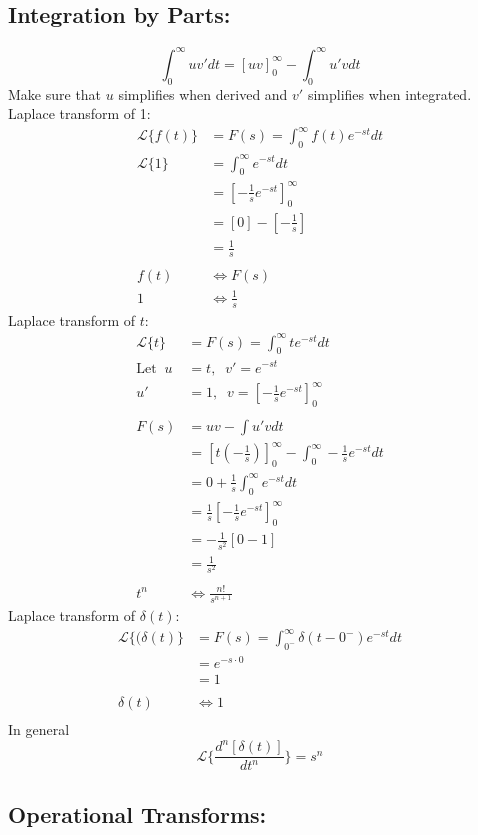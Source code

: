\documentclass[a5paper]{article}
\newcommand{\Lap}{\mathcal{L}}
\begin{document}
	\subsection{Integration by Parts:}
	$$\int^{\infty}_{0}uv'dt=[uv]^{\infty}_{0}-\int^{\infty}_{0}u'vdt$$
	Make sure that $u$ simplifies when derived and $v'$ simplifies when integrated. Laplace transform of 1:
	\begin{align*}
		\Lap\{f(t)\}&=F(s)=\int^{\infty}_{0}f(t)e^{-st}dt\\
		\Lap\{1\}&=\int^{\infty}_{0}e^{-st}dt\\
		&=[-\frac{1}{s}e^{-st}]^{\infty}_{0}\\
		&=[0]-[-\frac{1}{s}]\\
		&=\frac{1}{s}\\\\
		f(t)&\Leftrightarrow F(s)\\
		1&\Leftrightarrow \frac{1}{s}
	\end{align*}
	Laplace transform of $t$:
	\begin{align*}
		\Lap\{t\}&=F(s)=\int^{\infty}_{0}te^{-st}dt\\
		\text{Let}\;\;u&=t,\;\;v'=e^{-st}\\
		u'&=1,\;\;v=[-\frac{1}{s}e^{-st}]^{\infty}_{0}\\\\
		F(s)&=uv-\int u'vdt\\
		&=[t(-\frac{1}{s})]^{\infty}_{0}-\int^{\infty}_{0}-\frac{1}{s}e^{-st}dt\\
		&=0+\frac{1}{s}\int^{\infty}_{0}e^{-st}dt\\
		&=\frac{1}{s}[-\frac{1}{s}e^{-st}]^{\infty}_{0}\\
		&=-\frac{1}{s^{2}}[0-1]\\
		&=\frac{1}{s^{2}}\\\\
		t^{n}&\Leftrightarrow \frac{n!}{s^{n+1}}
	\end{align*}
	Laplace transform of $\delta(t)$:
	\begin{align*}
		\Lap\{(\delta(t)\}&=F(s)=\int^{\infty}_{0^{-}}\delta(t-0^{-})e^{-st}dt\\
		&=e^{-s\cdot 0}\\
		&=1\\\\
		\delta(t)&\Leftrightarrow 1\\
	\end{align*}
	In general
	$$\Lap\{\frac{d^{n}[\delta(t)]}{dt^{n}}\}=s^{n}$$
	\subsection{Operational Transforms:}
\end{document}
